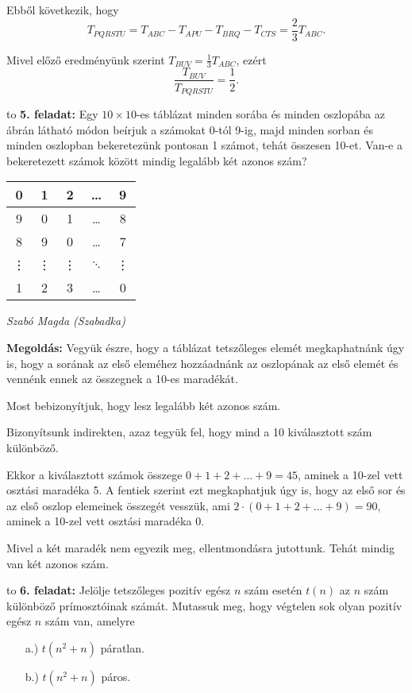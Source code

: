 \documentclass[a4paper,10pt]{article}
\newcommand{\ki}[2]{\hfill {\it #1 (#2)}\medskip}
\newcommand{\vonal}{\hbox to \hsize{\hskip2truecm\hrulefill\hskip2truecm}}
\begin{document}
Ebből következik, hogy
\[T_{PQRSTU}=T_{ABC}-T_{APU}-T_{BRQ}-T_{CTS}=\frac23T_{ABC}.\]

Mivel előző eredményünk szerint $T_{BUV}=\frac13T_{ABC}$, ezért
\[\frac{T_{BUV}}{T_{PQRSTU}}=\frac12.\]

\medskip

\vonal
{\bf 5. feladat: } Egy $10\times10$-es táblázat minden sorába és minden oszlopába az ábrán látható módon beírjuk a számokat 0-tól 9-ig, majd minden sorban és minden oszlopban bekeretezünk pontosan 1 számot, tehát összesen 10-et. Van-e a bekeretezett számok között mindig legalább két azonos szám?

\begin{table}[htbp]
\begin{center}
\begin{tabular}{|c|c|c|c|c|}
\hline
0 & 1 & 2 & \ldots & 9 \\ \hline
9 & 0 & 1 & \ldots & 8 \\ \hline
8 & 9 & 0 & \ldots & 7 \\ \hline
\vdots & \vdots & \vdots & $\ddots$ & \vdots \\ \hline
1 & 2 & 3 & \ldots & 0 \\ \hline
\end{tabular}
\end{center}
\end{table}

\ki{Szabó Magda}{Szabadka}\medskip

{\bf Megoldás: } Vegyük észre, hogy a táblázat tetszőleges elemét megkaphatnánk úgy is, hogy a sorának az első eleméhez hozzáadnánk az oszlopának az első elemét és vennénk ennek az összegnek a 10-es maradékát.

Most bebizonyítjuk, hogy lesz legalább két azonos szám.

Bizonyítsunk indirekten, azaz tegyük fel, hogy mind a 10 kiválasztott szám különböző.

Ekkor a kiválasztott számok összege $0+1+2+\ldots+9=45$, aminek a 10-zel vett osztási maradéka 5. A fentiek szerint ezt megkaphatjuk úgy is, hogy az első sor és az első oszlop elemeinek összegét vesszük, ami $2\cdot(0+1+2+\ldots+9)=90$, aminek a 10-zel vett osztási maradéka 0.

Mivel a két maradék nem egyezik meg, ellentmondásra jutottunk. Tehát mindig van két azonos szám.

\medskip

\vonal
{\bf 6. feladat: } 
Jelölje tetszőleges pozitív egész $n$ szám esetén $t(n)$ az $n$ szám különböző prímosz\-tó\-i\-nak számát. Mutassuk meg, hogy végtelen sok olyan pozitív egész $n$ szám van, amelyre
\begin{itemize}
\item[a.)] $t\left(n^2+n\right)$ páratlan.
\item[b.)] $t\left(n^2+n\right)$ páros.
\end{itemize}
\end{document}
